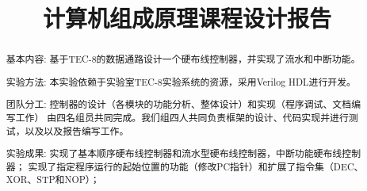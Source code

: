 \documentclass{mcmthesis}
\title{\LARGE\textbf{计算机组成原理课程设计报告}} %
\begin{document}
\begin{abstract}
  \par
  基本内容: 基于TEC-8的数据通路设计一个硬布线控制器，并实现了流水和中断功能。
  \par
  实验方法: 本实验依赖于实验室TEC-8实验系统的资源，采用Verilog HDL进行开发。
  \par
  团队分工: 控制器的设计（各模块的功能分析、整体设计）和实现（程序调试、文档编写工作）
  由四名组员共同完成。我们组四人共同负责框架的设计、代码实现并进行测试，以及以及报告编写工作。
  \par
  实验成果: 实现了基本顺序硬布线控制器和流水型硬布线控制器，中断功能硬布线控制器；
  实现了指定程序运行的起始位置的功能（修改PC指针）和扩展了指令集（DEC、XOR、STP和NOP）；
  \par
\end{abstract}
\maketitle
\tableofcontents
\pagebreak






% 
\end{document}

